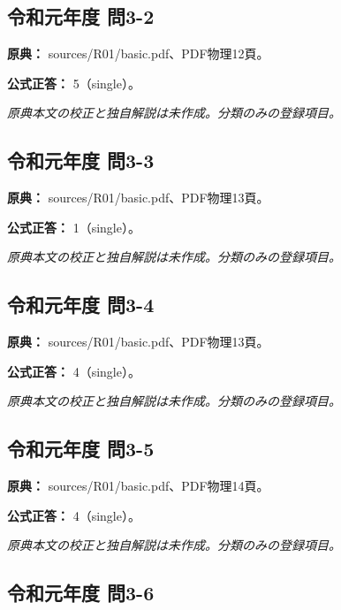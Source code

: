 \subsection{令和元年度 問3-2}
\label{q:r01-reg-basic-3-2}

\noindent\textbf{原典：} sources/R01/basic.pdf、PDF物理12頁。

\textbf{公式正答：} 5（single）。

\par\textit{原典本文の校正と独自解説は未作成。分類のみの登録項目。}

\subsection{令和元年度 問3-3}
\label{q:r01-reg-basic-3-3}

\noindent\textbf{原典：} sources/R01/basic.pdf、PDF物理13頁。

\textbf{公式正答：} 1（single）。

\par\textit{原典本文の校正と独自解説は未作成。分類のみの登録項目。}

\subsection{令和元年度 問3-4}
\label{q:r01-reg-basic-3-4}

\noindent\textbf{原典：} sources/R01/basic.pdf、PDF物理13頁。

\textbf{公式正答：} 4（single）。

\par\textit{原典本文の校正と独自解説は未作成。分類のみの登録項目。}

\subsection{令和元年度 問3-5}
\label{q:r01-reg-basic-3-5}

\noindent\textbf{原典：} sources/R01/basic.pdf、PDF物理14頁。

\textbf{公式正答：} 4（single）。

\par\textit{原典本文の校正と独自解説は未作成。分類のみの登録項目。}

\subsection{令和元年度 問3-6}
\label{q:r01-reg-basic-3-6}

